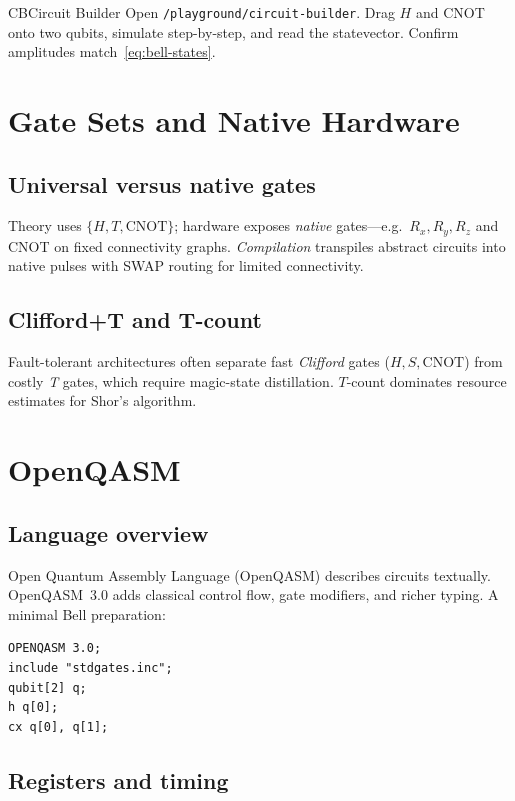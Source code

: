 \begin{labbox}{CB}{Circuit Builder}
Open \texttt{/playground/circuit-builder}. Drag $H$ and CNOT onto two qubits, simulate step-by-step, and read the statevector. Confirm amplitudes match~\eqref{eq:bell-states}.
\end{labbox}

\section{Gate Sets and Native Hardware}
\label{sec:gate-sets}

\subsection{Universal versus native gates}

Theory uses $\{H,T,\mathrm{CNOT}\}$; hardware exposes \emph{native} gates---e.g.\ $R_x,R_y,R_z$ and CNOT on fixed connectivity graphs. \emph{Compilation} transpiles abstract circuits into native pulses with SWAP routing for limited connectivity.

\subsection{Clifford+T and T-count}

Fault-tolerant architectures often separate fast \emph{Clifford} gates ($H,S,\mathrm{CNOT}$) from costly \emph{T} gates, which require magic-state distillation. $T$-count dominates resource estimates for Shor's algorithm.

\section{OpenQASM}
\label{sec:openqasm}

\subsection{Language overview}

Open Quantum Assembly Language (OpenQASM) describes circuits textually. OpenQASM~3.0 adds classical control flow, gate modifiers, and richer typing. A minimal Bell preparation:

\begin{verbatim}
OPENQASM 3.0;
include "stdgates.inc";
qubit[2] q;
h q[0];
cx q[0], q[1];
\end{verbatim}

\subsection{Registers and timing}

